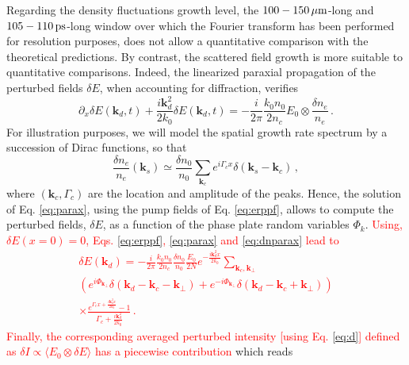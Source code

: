 \documentclass[
 reprint,
 superscriptaddress,
 amsmath,amssymb,
 aps,
]{revtex4-1}
\def\tc{\textcolor{red}}
\begin{document}
Regarding the density fluctuations  growth level, 
the $100-150\,\rm\mu m$-long  and $105-110\,\rm ps$-long window over which the Fourier transform has been performed for resolution purposes, does not allow a quantitative comparison with the theoretical predictions.
By contrast, the scattered field  growth is more suitable to quantitative comparisons. Indeed, the linearized paraxial propagation of the perturbed fields $\delta E$, when accounting for diffraction, verifies 
\begin{equation}
    \partial_x \delta E(\mathbf{k}_d,t) + \frac{i\mathbf{k}_d^2}{2k_0}\delta E(\mathbf{k}_d,t) = -\frac{i}{2\pi}\frac{k_0n_0}{2n_c}E_0\otimes \frac{\delta n_e}{n_e} \, . \label{eq:parax}
\end{equation}
For illustration purposes, we will model the spatial growth rate spectrum by a succession of Dirac functions, so that 
\begin{equation}
     \frac{\delta n_e}{n_e}(\mathbf{k}_s) \simeq  \frac{\delta n_0}{n_0} \sum_{\mathbf{k}_c} e^{i\Gamma_{c} x} \delta(\mathbf{k}_s-\mathbf{k}_c)\, , \label{eq:dnparax}
\end{equation}
where $(\mathbf{k}_c,\Gamma_{c})$ are the location and amplitude of the peaks. 
Hence,
the solution of Eq. \eqref{eq:parax}, using the pump fields of Eq. \eqref{eq:erppf},  allows to compute the perturbed fields, $\delta E$, as a function of the phase plate random variables $\Phi_k$. 
\tc{
Using, $\delta E(x=0)=0$, Eqs. \eqref{eq:erppf}, \eqref{eq:parax} and \eqref{eq:dnparax} lead to
\begin{align}
 \delta E(\mathbf{k}_d)=-\frac{i}{2\pi}\frac{k_0n_0}{2n_c} \frac{\delta n_0}{n_0}\frac{E_0}{2N} e^{-\frac{i\mathbf{k}_d^2 x}{2k_0}}   \sum_{\mathbf{k}_c,\mathbf{k}_\perp}\nonumber \\ 
 \left( 
 e^{i\Phi_{\mathbf{k}_\perp}}\delta( \mathbf{k}_d -\mathbf{k}_c-\mathbf{k}_\perp)
 +e^{-i\Phi_{\mathbf{k}_\perp}}\delta( \mathbf{k}_d -\mathbf{k}_c+\mathbf{k}_\perp)
 \right)\nonumber \\ 
 \times \frac{e^{\Gamma_cx+\frac{i\mathbf{k}_d^2 x}{2k_0} }-1}{\Gamma_c+\frac{i\mathbf{k}_d^2 }{2k_0}}  \, .
\end{align}
Finally, the corresponding averaged perturbed intensity [using Eq. \eqref{eq:d}] defined as 
$ \delta I \propto\langle  E_0 \otimes \delta E\rangle $ has  a   piecewise contribution} which  reads
\end{document}
